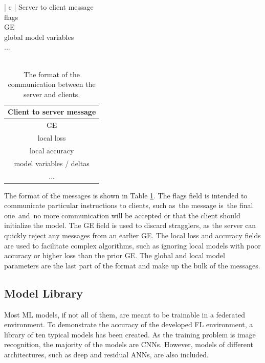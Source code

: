 \begin{table}[H]
    \center
    \begin{tabular}{ | c | }
        \hline
        Server to client message\\
        \hline\hline
        flags\\
        \hline
        GE\\
        \hline
        global model variables\\
        ...\\
        \hline
         \\
    \end{tabular}
    \quad
    \begin{tabular}{ | c | }
        \hline
        Client to server message\\
        \hline\hline
        GE\\
        \hline
        local loss\\
        \hline
        local accuracy\\
        \hline
        model variables / deltas\\
        ...\\
        \hline
    \end{tabular}
    \caption[Communication Scheme]{The format of the communication between the server and clients.}
    \label{table:FL messages structure}
\end{table}

The format of the messages is shown in Table \ref{table:FL messages structure}. The flags field is intended to communicate particular instructions to clients, such as the message is the final one and no more communication will be accepted or that the client should initialize the model. The GE field is used to discard stragglers, as the server can quickly reject any messages from an earlier GE. The local loss and accuracy fields are used to facilitate complex algorithms, such as ignoring local models with poor accuracy or higher loss than the prior GE. The global and local model parameters are the last part of the format and make up the bulk of the messages.

\subsection{Model Library}
Most ML models, if not all of them, are meant to be trainable in a federated environment. To demonstrate the accuracy of the developed FL environment, a library of ten typical models has been created. As the training problem is image recognition, the majority of the models are CNNs. However, models of different architectures, such as deep and residual ANNs, are also included.


